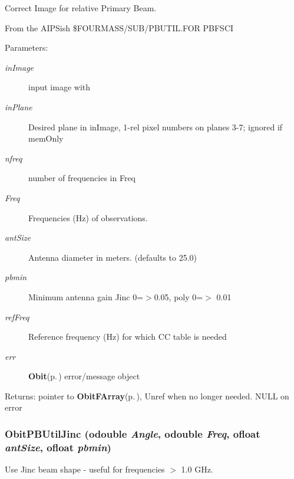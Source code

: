 Correct Image for relative Primary Beam. 

From the AIPSish \$FOURMASS/SUB/PBUTIL.FOR PBFSCI \begin{Desc}
\item[Parameters:]
\begin{description}
\item[{\em in\-Image}]input image with \item[{\em in\-Plane}]Desired plane in in\-Image, 1-rel pixel numbers on planes 3-7; ignored if mem\-Only \item[{\em nfreq}]number of frequencies in Freq \item[{\em Freq}]Frequencies (Hz) of observations. \item[{\em ant\-Size}]Antenna diameter in meters. (defaults to 25.0) \item[{\em pbmin}]Minimum antenna gain Jinc 0=$>$0.05, poly 0=$>$ 0.01 \item[{\em ref\-Freq}]Reference frequency (Hz) for which CC table is needed \item[{\em err}]{\bf Obit}{\rm (p.\,\pageref{structObit})} error/message object \end{description}
\end{Desc}
\begin{Desc}
\item[Returns:]pointer to {\bf Obit\-FArray}{\rm (p.\,\pageref{structObitFArray})}, Unref when no longer needed. NULL on error \end{Desc}
\subsubsection{ Obit\-PBUtil\-Jinc ({\bf odouble} {\em Angle}, {\bf odouble} {\em Freq}, {\bf ofloat} {\em ant\-Size}, {\bf ofloat} {\em pbmin})}\label{ObitPBUtil_8h_a1}


Use Jinc beam shape - useful for frequencies $>$ 1.0 GHz. 

